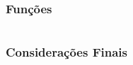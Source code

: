 \documentclass[aspectratio=1610]{beamer}
\begin{document}
\section [Funções]{}
\begin{frame}
  \frametitle{Funções}
  \framesubtitle{}

\end{frame}


\section [Considerações]{}
\begin{frame}
  \frametitle{Considerações Finais}
  \maketitle

\end{frame}
\end{document}
